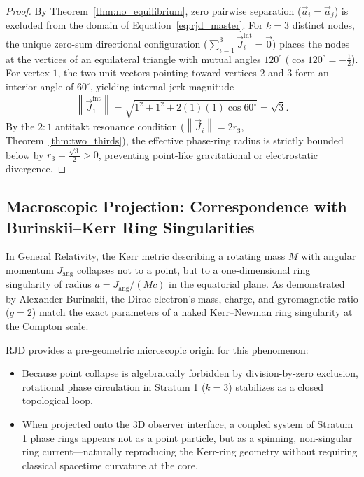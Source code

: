 \documentclass[11pt,a4paper]{article}
\theoremstyle{plain}
\theoremstyle{definition}
\theoremstyle{remark}
\newcommand{\Jerk}{\vec{J}}
\newcommand{\Acc}{\vec{a}}
\newcommand{\norm}[1]{\left\lVert #1 \right\rVert}
\begin{document}
\begin{proof}
By Theorem~\ref{thm:no_equilibrium}, zero pairwise separation ($\Acc_i = \Acc_j$) is excluded from the domain of Equation~\eqref{eq:rjd_master}. For $k=3$ distinct nodes, the unique zero-sum directional configuration ($\sum_{i=1}^3 \Jerk_i^{\mathrm{int}} = \vec{0}$) places the nodes at the vertices of an equilateral triangle with mutual angles $120^\circ$ ($\cos 120^\circ = -\frac{1}{2}$). For vertex $1$, the two unit vectors pointing toward vertices $2$ and $3$ form an interior angle of $60^\circ$, yielding internal jerk magnitude
\begin{equation}
    \norm{\Jerk_1^{\mathrm{int}}} = \sqrt{1^2 + 1^2 + 2(1)(1)\cos 60^\circ} = \sqrt{3}.
\end{equation}
By the $2:1$ antitakt resonance condition ($\norm{\Jerk_i} = 2 r_3$, Theorem~\ref{thm:two_thirds}), the effective phase-ring radius is strictly bounded below by $r_3 = \frac{\sqrt{3}}{2} > 0$, preventing point-like gravitational or electrostatic divergence.
\end{proof}

\subsection{Macroscopic Projection: Correspondence with Burinskii--Kerr Ring Singularities}
In General Relativity, the Kerr metric describing a rotating mass $M$ with angular momentum $J_{\mathrm{ang}}$ collapses not to a point, but to a one-dimensional ring singularity of radius $a = J_{\mathrm{ang}} / (Mc)$ in the equatorial plane. As demonstrated by Alexander Burinskii, the Dirac electron's mass, charge, and gyromagnetic ratio ($g = 2$) match the exact parameters of a naked Kerr--Newman ring singularity at the Compton scale.

RJD provides a pre-geometric microscopic origin for this phenomenon:
\begin{itemize}
    \item Because point collapse is algebraically forbidden by division-by-zero exclusion, rotational phase circulation in Stratum 1 ($k=3$) stabilizes as a closed topological loop.
    \item When projected onto the $3\text{D}$ observer interface, a coupled system of Stratum 1 phase rings appears not as a point particle, but as a spinning, non-singular ring current—naturally reproducing the Kerr-ring geometry without requiring classical spacetime curvature at the core.
\end{itemize}
\end{document}
